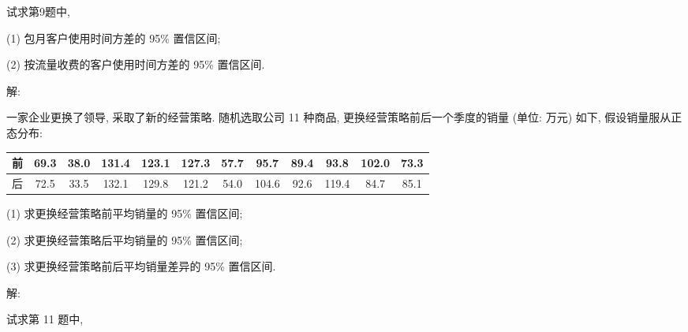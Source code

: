 \documentclass[standard]{ExBook}
\begin{document}
\begin{qitems}
\vspace{-5em}

    \begin{bbox}
    \begin{shaded}
        \qitem
试求第9题中,

(1) 包月客户使用时间方差的 95\% 置信区间;

(2) 按流量收费的客户使用时间方差的 95\% 置信区间.
    \end{shaded}
    \end{bbox}

\vspace{-5em}

    \begin{bbox}
解: 
    \end{bbox}

\vspace{-5em}

    \begin{bbox}
    \begin{shaded}
        \qitem
一家企业更换了领导, 采取了新的经营策略. 随机选取公司 11 种商品, 更换经营策略前后一个季度的销量 (单位: 万元) 如下, 假设销量服从正态分布:
\begin{center}
\setlength{\tabcolsep}{8.5pt}
\begin{tabular}{c|ccccccccccc}
    \hline
    前 & 69.3 & 38.0 & 131.4 & 123.1 & 127.3 & 57.7 & 95.7 & 89.4 & 93.8 & 102.0 & 73.3\\
    \hline
    后 & 72.5 & 33.5 & 132.1 & 129.8 & 121.2 & 54.0 & 104.6 & 92.6 & 119.4 & 84.7 & 85.1\\
    \hline
\end{tabular}
\end{center}
(1) 求更换经营策略前平均销量的 95\% 置信区间;

(2) 求更换经营策略后平均销量的 95\% 置信区间;

(3) 求更换经营策略前后平均销量差异的 95\% 置信区间.
    \end{shaded}
    \end{bbox}

\vspace{-5em}

    \begin{bbox}
解: 
    \end{bbox}

\vspace{-5em}

    \begin{bbox}
    \begin{shaded}
        \qitem
试求第 11 题中,


\end{shaded}
\end{bbox}
\end{qitems}
\end{document}
